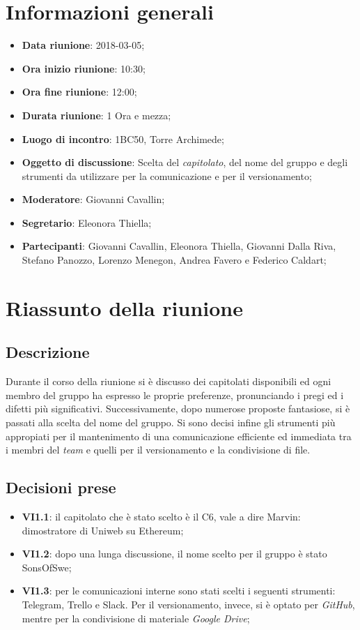 \section{Informazioni generali}
	\begin{itemize}
		\item \textbf{Data riunione}: 2018-03-05;
		\item \textbf{Ora inizio riunione}: 10:30;
		\item \textbf{Ora fine riunione}: 12:00;
		\item \textbf{Durata riunione}: 1 Ora e mezza;
		\item \textbf{Luogo di incontro}: 1BC50, Torre Archimede;
		\item \textbf{Oggetto di discussione}: Scelta del \emph{capitolato}, del nome del gruppo e degli strumenti da utilizzare per la comunicazione e per il versionamento;
		\item \textbf{Moderatore}: Giovanni Cavallin;
		\item \textbf{Segretario}: Eleonora Thiella;
		\item \textbf{Partecipanti}: Giovanni Cavallin, Eleonora Thiella, Giovanni Dalla Riva, Stefano Panozzo, Lorenzo Menegon, Andrea Favero e Federico Caldart;
	\end{itemize}

\section{Riassunto della riunione}
	\subsection{Descrizione}
	Durante il corso della riunione si è discusso dei capitolati disponibili ed ogni membro del gruppo ha espresso le proprie preferenze, pronunciando i pregi ed i difetti più significativi. Successivamente, dopo numerose proposte fantasiose, si è passati alla scelta del nome del gruppo. Si sono decisi infine gli strumenti più appropiati per il mantenimento di una comunicazione efficiente ed immediata tra i membri del \emph{team} e quelli per il versionamento e la condivisione di file. 
	
	\subsection{Decisioni prese}
		\begin{itemize}
			\item \textbf{VI1.1}: il capitolato che è stato scelto è il C6, vale a dire Marvin: dimostratore di Uniweb su Ethereum;
			\item \textbf{VI1.2}: dopo una lunga discussione, il nome scelto per il gruppo è stato SonsOfSwe;
			\item \textbf{VI1.3}: per le comunicazioni interne sono stati scelti i seguenti strumenti: Telegram, Trello e Slack. Per il versionamento, invece, si è optato per \emph{GitHub}, mentre per la condivisione di materiale \emph{Google Drive}; 
		\end{itemize}